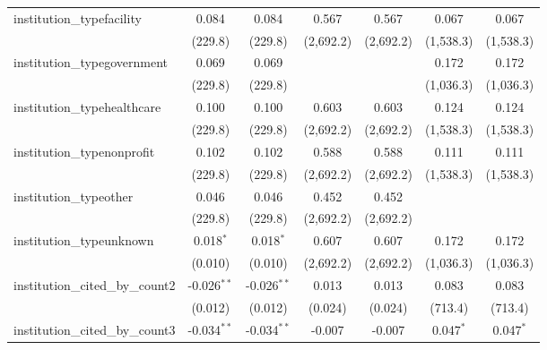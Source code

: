 \begin{tabular}{lcccccc}
   institution\_typefacility             & 0.084          & 0.084          & 0.567          & 0.567          & 0.067         & 0.067\\   
                                         & (229.8)        & (229.8)        & (2,692.2)      & (2,692.2)      & (1,538.3)     & (1,538.3)\\   
   institution\_typegovernment           & 0.069          & 0.069          &                &                & 0.172         & 0.172\\   
                                         & (229.8)        & (229.8)        &                &                & (1,036.3)     & (1,036.3)\\   
   institution\_typehealthcare           & 0.100          & 0.100          & 0.603          & 0.603          & 0.124         & 0.124\\   
                                         & (229.8)        & (229.8)        & (2,692.2)      & (2,692.2)      & (1,538.3)     & (1,538.3)\\   
   institution\_typenonprofit            & 0.102          & 0.102          & 0.588          & 0.588          & 0.111         & 0.111\\   
                                         & (229.8)        & (229.8)        & (2,692.2)      & (2,692.2)      & (1,538.3)     & (1,538.3)\\   
   institution\_typeother                & 0.046          & 0.046          & 0.452          & 0.452          &               &   \\   
                                         & (229.8)        & (229.8)        & (2,692.2)      & (2,692.2)      &               &   \\   
   institution\_typeunknown              & 0.018$^{*}$    & 0.018$^{*}$    & 0.607          & 0.607          & 0.172         & 0.172\\   
                                         & (0.010)        & (0.010)        & (2,692.2)      & (2,692.2)      & (1,036.3)     & (1,036.3)\\   
   institution\_cited\_by\_count2        & -0.026$^{**}$  & -0.026$^{**}$  & 0.013          & 0.013          & 0.083         & 0.083\\   
                                         & (0.012)        & (0.012)        & (0.024)        & (0.024)        & (713.4)       & (713.4)\\   
   institution\_cited\_by\_count3        & -0.034$^{**}$  & -0.034$^{**}$  & -0.007         & -0.007         & 0.047$^{*}$   & 0.047$^{*}$\\   

\end{tabular}
